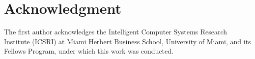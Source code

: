 \section*{Acknowledgment}
The first author acknowledges the Intelligent Computer Systems Research Institute (ICSRI) at Miami Herbert Business School, University of Miami, and its Fellows Program, under which this work was conducted.